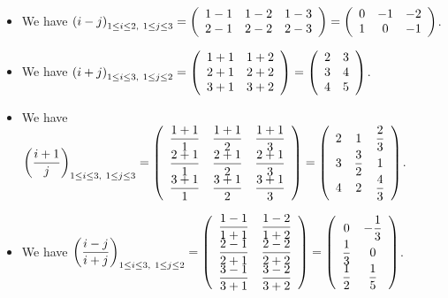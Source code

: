 \documentclass[numbers=enddot,12pt,final,onecolumn,notitlepage]{scrartcl}%
\theoremstyle{definition}
\begin{document}
\begin{itemize}
\item We have $\left(  i-j\right)  _{1\leq i\leq2,\ 1\leq j\leq3}=\left(
\begin{array}
[c]{ccc}%
1-1 & 1-2 & 1-3\\
2-1 & 2-2 & 2-3
\end{array}
\right)  =\left(
\begin{array}
[c]{ccc}%
0 & -1 & -2\\
1 & 0 & -1
\end{array}
\right)  $.

\item We have $\left(  i+j\right)  _{1\leq i\leq3,\ 1\leq j\leq2}=\left(
\begin{array}
[c]{cc}%
1+1 & 1+2\\
2+1 & 2+2\\
3+1 & 3+2
\end{array}
\right)  =\left(
\begin{array}
[c]{cc}%
2 & 3\\
3 & 4\\
4 & 5
\end{array}
\right)  $.

\item We have $\left(  \dfrac{i+1}{j}\right)  _{1\leq i\leq3,\ 1\leq j\leq
3}=\left(
\begin{array}
[c]{ccc}%
\dfrac{1+1}{1} & \dfrac{1+1}{2} & \dfrac{1+1}{3}\\
\dfrac{2+1}{1} & \dfrac{2+1}{2} & \dfrac{2+1}{3}\\
\dfrac{3+1}{1} & \dfrac{3+1}{2} & \dfrac{3+1}{3}%
\end{array}
\right)  =\left(
\begin{array}
[c]{ccc}%
2 & 1 & \dfrac{2}{3}\\
3 & \dfrac{3}{2} & 1\\
4 & 2 & \dfrac{4}{3}%
\end{array}
\right)  $.

\item We have $\left(  \dfrac{i-j}{i+j}\right)  _{1\leq i\leq3,\ 1\leq j\leq
2}=\left(
\begin{array}
[c]{cc}%
\dfrac{1-1}{1+1} & \dfrac{1-2}{1+2}\\
\dfrac{2-1}{2+1} & \dfrac{2-2}{2+2}\\
\dfrac{3-1}{3+1} & \dfrac{3-2}{3+2}%
\end{array}
\right)  =\left(
\begin{array}
[c]{cc}%
0 & -\dfrac{1}{3}\\
\dfrac{1}{3} & 0\\
\dfrac{1}{2} & \dfrac{1}{5}%
\end{array}
\right)  $.
\end{itemize}
\end{document}
